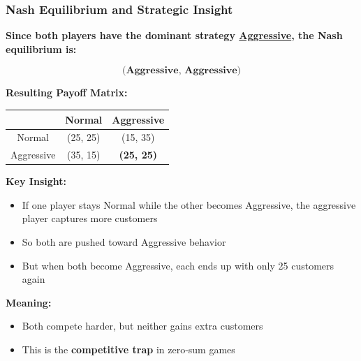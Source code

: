 \begin{frame}[fragile]\frametitle{Nash Equilibrium and Strategic Insight}

\textbf{Since both players have the dominant strategy \underline{Aggressive}, the Nash equilibrium is:}

\[
\textbf{(Aggressive,\ Aggressive)}
\]

\vspace{6pt}

\textbf{Resulting Payoff Matrix:}

\begin{center}
\begin{tabular}{|c|c|c|}
  \hline
  & Normal & Aggressive \\
  \hline
  Normal & (25, 25) & (15, 35) \\
  \hline
  Aggressive & (35, 15) & \textbf{(25, 25)} \\
  \hline
\end{tabular}
\end{center}

\vspace{6pt}

\textbf{Key Insight:}

\begin{itemize}
  \item If one player stays Normal while the other becomes Aggressive, the aggressive player captures more customers
  \item So both are pushed toward Aggressive behavior
  \item But when both become Aggressive, each ends up with only 25 customers again
\end{itemize}

\vspace{6pt}

\textbf{Meaning:}
\begin{itemize}
  \item Both compete harder, but neither gains extra customers
  \item This is the \textbf{competitive trap} in zero-sum games
\end{itemize}

\end{frame}

